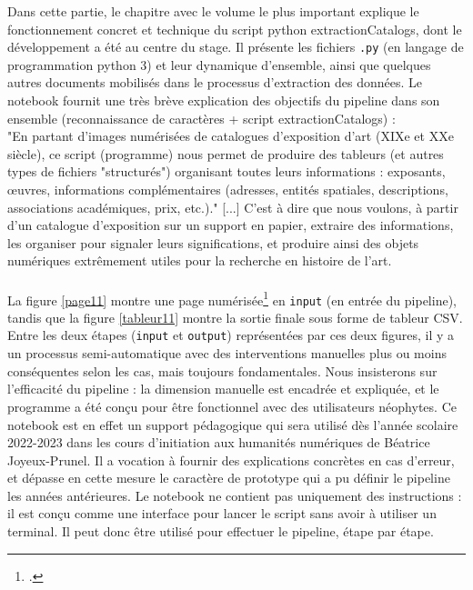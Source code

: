 \documentclass[a4paper,12pt,twoside]{book}
\begin{document}
Dans cette partie, le chapitre avec le volume le plus important explique le fonctionnement concret et technique du script python extractionCatalogs, dont le développement a été au centre du stage. Il présente les fichiers \texttt{.py} (en langage de programmation python 3) et leur dynamique d'ensemble, ainsi que quelques autres documents mobilisés dans le processus d'extraction des données. 
Le notebook fournit une très brève explication des objectifs du pipeline dans son ensemble (reconnaissance de caractères + script extractionCatalogs) :\\

"En partant d'images numérisées de catalogues d'exposition d'art (XIXe et XXe siècle), ce script (programme) nous permet de produire des tableurs (et autres types de fichiers "structurés") organisant toutes leurs informations : exposants, œuvres, informations complémentaires (adresses, entités spatiales, descriptions, associations académiques, prix, etc.)."
[...] C'est à dire que nous voulons, à partir d'un catalogue d'exposition sur un support en papier, extraire des informations, les organiser pour signaler leurs significations, et produire ainsi des objets numériques extrêmement utiles pour la recherche en histoire de l'art.\\\\

La figure \ref{page11} montre une page numérisée\footcite[p. 11]{salondautomneCatalogueOuvragesPeinture1940} en \texttt{input} (en entrée du pipeline), tandis que la figure \ref{tableur11} montre la sortie finale sous forme de tableur CSV. Entre les deux étapes (\texttt{input} et \texttt{output}) représentées par ces deux figures, il y a un processus semi-automatique avec des interventions manuelles plus ou moins conséquentes selon les cas, mais toujours fondamentales. Nous insisterons sur l'efficacité du pipeline : la dimension manuelle est encadrée et expliquée, et le programme a été conçu pour être fonctionnel avec des utilisateurs néophytes. Ce notebook est en effet un support pédagogique qui sera utilisé dès l'année scolaire 2022-2023 dans les cours d'initiation aux humanités numériques de Béatrice Joyeux-Prunel. Il a vocation à fournir des explications concrètes en cas d'erreur, et dépasse en cette mesure le caractère de prototype qui a pu définir le pipeline les années antérieures. Le notebook ne contient pas uniquement des instructions : il est conçu comme une interface pour lancer le script sans avoir à utiliser un terminal. Il peut donc être utilisé pour effectuer le pipeline, étape par étape.\\
\end{document}
